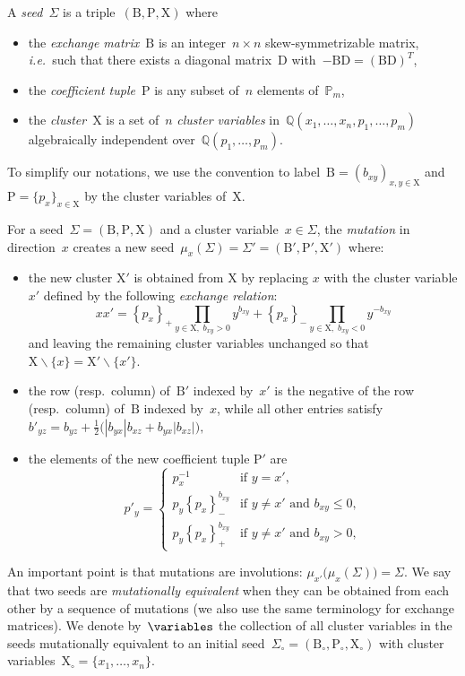 \documentclass{amsart}
\theoremstyle{definition}
\newcommand{\Q}{\mathbb{Q}} %
\newcommand{\ssm}{\smallsetminus} %
\newcommand{\ie}{\textit{i.e.}~} %
\newcommand{\darkblue}{\color{darkblue}} %
\newcommand{\defn}[1]{\textsl{\darkblue #1}} %
\newcommand{\Trop}[1]{\mathbb{P}_{#1}} %
\newcommand{\positiveExponents}[1]{\left\{#1\right\}_+} %
\newcommand{\negativeExponents}[1]{\left\{#1\right\}_-} %
\newcommand{\seed}{\Sigma} %
\newcommand{\cluster}{\mathrm{X}} %
\newcommand{\coefficients}{\mathrm{P}} %
\newcommand{\B}{\mathrm{B}} %
\newcommand{\D}{\mathrm{D}} %
\begin{document}
\medskip
A \defn{seed}~$\seed$ is a triple~$(\B, \coefficients, \cluster)$ where
\begin{itemize}
\item the \defn{exchange matrix}~$\B$ is an integer~$n \times n$ skew-symmetrizable matrix, \ie such that there exists a diagonal matrix~$\D$ with~$-\B\D = (\B\D)^T$,
\item the \defn{coefficient tuple}~$\coefficients$ is any subset of~$n$ elements of~$\Trop{m}$,
\item the \defn{cluster}~$\cluster$ is a set of~$n$ \defn{cluster variables} in~$\Q(x_1, \dots, x_n, p_1, \dots, p_m)$ algebraically independent over~$\Q(p_1, \dots, p_m)$.
\end{itemize}
To simplify our notations, we use the convention to label~$\B = (b_{xy})_{x,y \in \cluster}$ and~$\coefficients = \{p_x\}_{x \in \cluster}$ by the cluster variables of~$\cluster$.

For a seed~$\seed = (\B, \coefficients, \cluster)$ and a cluster variable~$x \in \seed$, the \defn{mutation} in direction~$x$ creates a new seed~$\mu_x(\seed) = \seed' = (\B', \coefficients', \cluster')$ where:
\begin{itemize}
\item the new cluster $\cluster'$ is obtained from $\cluster$ by replacing $x$ with the cluster variable $x'$ defined by the following \defn{exchange relation}:
\[
x x' = \positiveExponents{p_x} \prod_{{y \in \cluster, \; b_{xy}  > 0}} y^{b_{xy}} + \negativeExponents{p_x} \prod_{{y \in \cluster, \; b_{xy}  <0}} y^{-b_{xy}}
\]
and leaving the remaining cluster variables unchanged so that $\cluster \ssm \{x\} = \cluster' \ssm \{x'\}$.

\item the row (resp.~column) of~$\B'$ indexed by~$x'$ is the negative of the row (resp.~column) of~$\B$ indexed by~$x$, while all other entries satisfy
\(
b'_{yz} = b_{yz} + \frac{1}{2}\big(|b_{yx}| b_{xz} + b_{yx}|b_{xz}|\big),
\)

\item the elements of the new coefficient tuple $\coefficients'$ are 
\[
p'_y =
\begin{cases}
	p_x^{-1}  & \text{if } y = x', \\
	p_y\negativeExponents{p_x}^{b_{xy}}  & \text{if } y \neq x' \text{ and } b_{xy} \leq 0, \\
	p_y\positiveExponents{p_x}^{b_{xy}}  & \text{if } y \neq x' \text{ and } b_{xy} > 0,
\end{cases}
\]
\end{itemize}
An important point is that mutations are involutions: $\mu_{x'} \big( \mu_{x}(\seed) \big) = \seed$.
We say that two seeds are \defn{mutationally equivalent} when they can be obtained from each other by a sequence of mutations (we also use the same terminology for exchange matrices).
We denote by~$\variables$ the collection of all cluster variables in the seeds mutationally equivalent to an initial seed~$\seed_\circ = (\B_\circ, \coefficients_\circ, \cluster_\circ)$ with cluster variables~$\cluster_\circ = \{x_1, \dots, x_n\}$.
\end{document}
